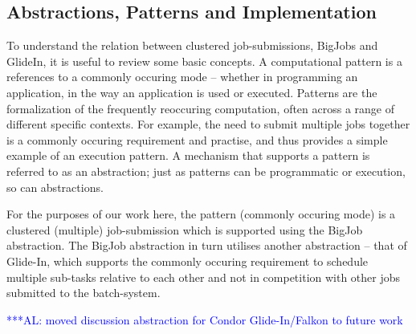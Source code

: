 \documentclass{rspublic}
\newcommand{\alnote}[1]{ {\textcolor{blue} { ***AL: #1 }}}
\newcommand{\alnote}[1]{}
\newcommand{\glidein}[1]{Glide-In }
\newcommand{\remanager}[1]{RE-Manager }
\begin{document}
\subsection{Abstractions, Patterns and Implementation}

To understand the relation between clustered job-submissions, BigJobs
and GlideIn, it is useful to review some basic concepts.
A computational pattern is a references to a commonly occuring mode --
whether in programming an application, in the way an application is
used or executed. Patterns are the formalization of the frequently
reoccuring computation, often across a range of different specific
contexts. For example, the need to submit multiple jobs together is a
commonly occuring requirement and practise, and thus provides a simple
example of an execution pattern.  A mechanism that supports a pattern
is referred to as an abstraction; just as patterns can be programmatic
or execution, so can abstractions.

For the purposes of our work here, the pattern (commonly occuring
mode) is a clustered (multiple) job-submission which is supported
using the BigJob abstraction. The BigJob abstraction in turn utilises
another abstraction -- that of Glide-In, which supports the commonly
occuring requirement to schedule multiple sub-tasks relative to each
other and not in competition with other jobs submitted to the
batch-system.


\alnote{moved discussion abstraction for Condor Glide-In/Falkon to future work}


\end{document}
